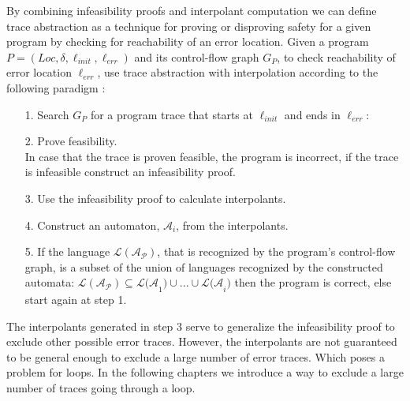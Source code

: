 \documentclass{article}
\begin{document}
By combining infeasibility proofs and interpolant computation we can define trace abstraction as a technique for proving or disproving safety for a given program by checking for reachability of an error location.
Given a program $P = (Loc, \delta, \ell_{init}, \ell_{err})$ and its control-flow graph $G_P$, to check reachability of error location $\ell_{err}$, use trace abstraction with interpolation according to the following paradigm \cite{10.1007/978-3-642-03237-0_7}: \\
\begin{itemize}
	\item[1.] Search $G_P$ for a program trace that starts at $\ell_{init}$ and ends in $\ell_{err}$:
	\begin{figure}[H]
		\centering
	\end{figure}
		\item[2.] Prove feasibility. \\ In case that the trace is proven feasible, the program is incorrect, if the trace is infeasible construct an infeasibility proof.
		\item[3.] Use the infeasibility proof to calculate interpolants.
		\item[4.] Construct an automaton, $\mathcal{A}_i$, from the interpolants.
		\item[5.] If the language $\mathcal{L(A_P)}$, that is recognized by the program's control-flow graph, is a subset of the union of languages recognized by the constructed automata: $\mathcal{L(A_P)} \subseteq \mathcal{L(A}_1) \cup ... \cup \mathcal{L(A}_i)$ then the program is correct, else start again at step 1.
	\end{itemize}
	The interpolants generated in step 3 serve to generalize the infeasibility proof to exclude other possible error traces. However, the interpolants are not guaranteed to be general enough to exclude a large number of error traces. Which poses a problem for loops. In the following chapters we introduce a way to exclude a large number of traces going through a loop.
\end{document}
